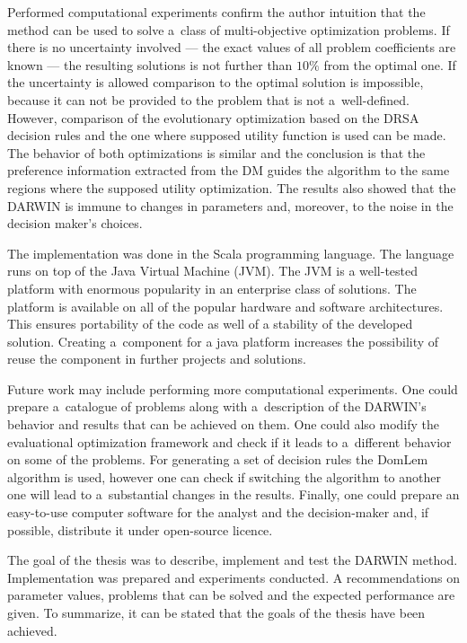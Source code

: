 Performed computational experiments confirm the author intuition that the
method can be used to solve a~class of multi-objective optimization
problems. If there is no uncertainty involved --- the exact values of all
problem coefficients are known --- the resulting solutions is not further than
$10\%$ from the optimal one. If the uncertainty is allowed comparison to the
optimal solution is impossible, because it can not be provided to the problem
that is not a~well-defined. However, comparison of the evolutionary
optimization based on the DRSA decision rules and the one where supposed
utility function is used can be made. The behavior of both optimizations is
similar and the conclusion is that the preference information extracted from
the DM guides the algorithm to the same regions where the supposed utility
optimization. The results also showed that the DARWIN is immune to changes in
parameters and, moreover, to the noise in the decision maker's choices.

The implementation was done in the Scala programming language. The language
runs on top of the Java Virtual Machine (JVM). The JVM is a well-tested
platform with enormous popularity in an enterprise class of solutions. The
platform is available on all of the popular hardware and software
architectures. This ensures portability of the code as well of a stability of
the developed solution. Creating a~component for a java platform increases the
possibility of reuse the component in further projects and solutions.

Future work may include performing more computational experiments. One could
prepare a~catalogue of problems along with a~description of the DARWIN's
behavior and results that can be achieved on them. One could also modify the
evaluational optimization framework and check if it leads to a~different
behavior on some of the problems. For generating a set of decision rules the
DomLem algorithm is used, however one can check if switching the algorithm to
another one will lead to a~substantial changes in the results. Finally, one
could prepare an easy-to-use computer software for the analyst and the
decision-maker and, if possible, distribute it under open-source licence.

The goal of the thesis was to describe, implement and test the DARWIN
method. Implementation was prepared and experiments conducted. A
recommendations on parameter values, problems that can be solved and the
expected performance are given. To summarize, it can be stated that the goals
of the thesis have been achieved.

